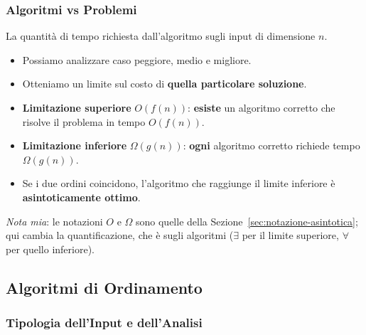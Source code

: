 \documentclass[12pt, a4paper]{article}
\begin{document}
\subsubsection{Algoritmi vs Problemi}

\begin{tcolorbox}[colback=lightergray!10, colframe=tocsec, title=\textbf{Complessità in Tempo di un Algoritmo}]
La quantità di tempo richiesta dall'algoritmo sugli input di dimensione $n$.
\begin{itemize}
    \item Possiamo analizzare caso peggiore, medio e migliore.
    \item Otteniamo un limite sul costo di \textbf{quella particolare soluzione}.
\end{itemize}
\end{tcolorbox}

\begin{tcolorbox}[colback=lightergray!10, colframe=tocsec, title=\textbf{Complessità in Tempo di un Problema Computazionale}]
\begin{itemize}
    \item \textcolor{blue!70!black}{\textbf{Limitazione superiore}} $O(f(n))$: \textbf{esiste} un algoritmo corretto che risolve il problema in tempo $O(f(n))$.
    \item \textcolor{orange!70!black}{\textbf{Limitazione inferiore}} $\Omega(g(n))$: \textbf{ogni} algoritmo corretto richiede tempo $\Omega(g(n))$.
    \item Se i due ordini coincidono, l'algoritmo che raggiunge il limite inferiore è \textbf{asintoticamente ottimo}.
\end{itemize}
\end{tcolorbox}

\textit{Nota mia}: le notazioni $O$ e $\Omega$ sono quelle della Sezione~\ref{sec:notazione-asintotica}; qui cambia la quantificazione, che è sugli algoritmi ($\exists$ per il limite superiore, $\forall$ per quello inferiore).


\subsection{Algoritmi di Ordinamento}
\label{sec:algoritmi-ordinamento}

\subsubsection{Tipologia dell'Input e dell'Analisi}
\end{document}
